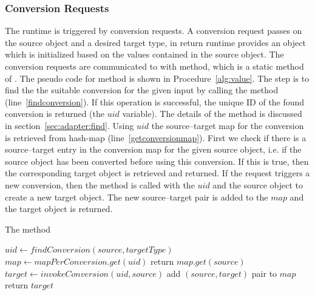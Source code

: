 \subsubsection{\zamk Conversion Requests}
The \zamk runtime is triggered by conversion requests. 
A conversion request passes on the source object and a desired target type, in return \zamk runtime provides an object which is initialized based on the values contained in the source object.
The conversion requests are communicated to \zamk with  method, which is a static method of .
The pseudo code for  method is shown in Procedure~\ref{alg:value}. 
The step is to find the the suitable conversion for the given input by calling the  method (line~\ref{findconversion}). If this operation is successful, the unique ID of the found conversion is returned (the $uid$ variable). The details of the  method is discussed in section~\ref{sec:adapter:find}. 
Using $uid$ the source--target map for the conversion is retrieved from  hash-map (line~\ref{getconversionmap}).
First we check if there is a source--target entry in the conversion map for the given source object, i.e. if the source object has been converted before using this conversion. 
If this is true, then the corresponding target object is retrieved and returned.
If the request triggers a new conversion, then the  method is called with the $uid$ and the source object to create a new target object. 
The new source--target pair is added to the $map$ and the target object is returned.


\begin{algorithm}
\caption{The  method}\label{alg:value}
	\begin{algorithmic}[1]
		\State $uid \gets findConversion(source, targetType)$ \label{findConversion}
		\State $map \gets mapPerConversion.get(uid)$ 
		\label{getconversionmap}
			\State return $map.get(source)$ \label{existingconversion}
		\Else
			\State $target \gets invokeConversion(uid, source)$ \label{newconversion}
			\State add $(source, target)$ pair to $map$ \label{addtomap}
			\State return $target$
		\EndIf
		\EndProcedure
	\end{algorithmic}
\end{algorithm}








